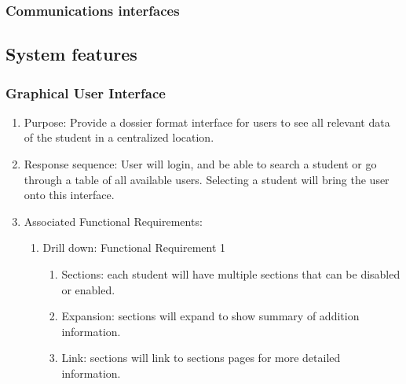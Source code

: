 \documentclass{journal}
\begin{document}
\subsubsection{Communications interfaces}
\subsection{System features}
\subsubsection{Graphical User Interface}
\begin{enumerate}
\item Purpose: Provide a dossier format interface for users to see all relevant data of the student in a centralized location.
\item Response sequence: User will login, and be able to search a student or go through a table of all available users. Selecting a student will bring the user onto this interface.
\item Associated Functional Requirements:
\begin{enumerate}
\item Drill down: Functional Requirement 1
\begin{enumerate}
\item Sections: each student will have multiple sections that can be disabled or enabled.
\item Expansion: sections will expand to show summary of addition information.
\item Link: sections will link to sections pages for more detailed information.
\end{enumerate}
\end{enumerate}
\end{enumerate}
\end{document}
